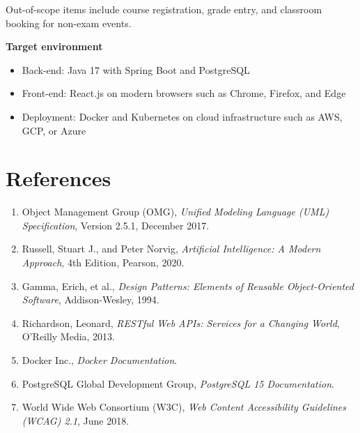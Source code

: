 \documentclass[11pt]{report}
\begin{document}
Out-of-scope items include course registration, grade entry, and classroom booking for non-exam events.

\textbf{Target environment}
\begin{itemize}
\item Back-end: Java 17 with Spring Boot and PostgreSQL
\item Front-end: React.js on modern browsers such as Chrome, Firefox, and Edge
\item Deployment: Docker and Kubernetes on cloud infrastructure such as AWS, GCP, or Azure
\end{itemize}

\section{References}
\begin{enumerate}
\item Object Management Group (OMG), \emph{Unified Modeling Language (UML) Specification}, Version 2.5.1, December 2017.
\item Russell, Stuart J., and Peter Norvig, \emph{Artificial Intelligence: A Modern Approach}, 4th Edition, Pearson, 2020.
\item Gamma, Erich, et al., \emph{Design Patterns: Elements of Reusable Object-Oriented Software}, Addison-Wesley, 1994.
\item Richardson, Leonard, \emph{RESTful Web APIs: Services for a Changing World}, O'Reilly Media, 2013.
\item Docker Inc., \emph{Docker Documentation}.
\item PostgreSQL Global Development Group, \emph{PostgreSQL 15 Documentation}.
\item World Wide Web Consortium (W3C), \emph{Web Content Accessibility Guidelines (WCAG) 2.1}, June 2018.
\end{enumerate}
\end{document}

